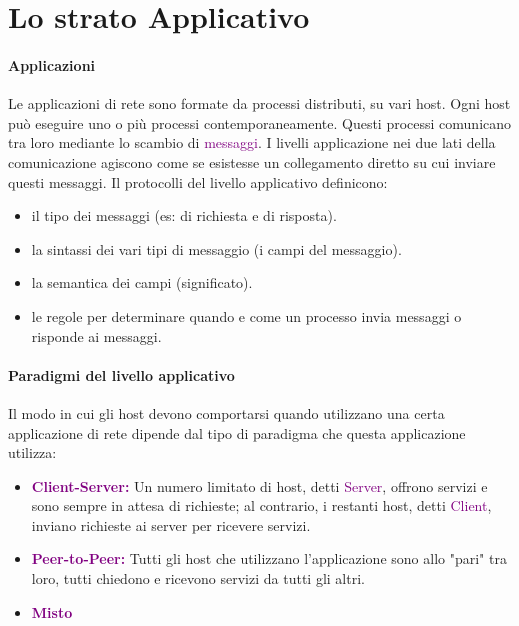\section{Lo strato Applicativo}
\paragraph{Applicazioni} 
Le applicazioni di rete sono formate da processi distributi, su vari host. Ogni host può eseguire uno o più processi contemporaneamente. Questi processi comunicano tra loro mediante lo scambio di \textcolor{purple}{messaggi}.
\newline I livelli applicazione nei due lati della comunicazione agiscono come se esistesse un collegamento diretto su cui inviare questi messaggi.
\newline Il protocolli del livello applicativo definicono:
\begin{itemize}
    \item il tipo dei messaggi (es: di richiesta e di risposta).
    \item la sintassi dei vari tipi di messaggio (i campi del messaggio).
    \item la semantica dei campi (significato).
    \item le regole per determinare quando e come un processo invia messaggi o risponde ai messaggi.
\end{itemize}

\paragraph{Paradigmi del livello applicativo} Il modo in cui gli host devono comportarsi quando utilizzano una certa applicazione di rete dipende dal tipo di paradigma che questa applicazione utilizza:
\begin{itemize}
    \item \textbf{\textcolor{purple}{Client-Server:}} Un numero limitato di host, detti \textcolor{purple}{Server}, offrono servizi e sono sempre in attesa di richieste; al contrario, i restanti host, detti \textcolor{purple}{Client}, inviano richieste ai server per ricevere servizi.
    \item \textbf{\textcolor{purple}{Peer-to-Peer:}} Tutti gli host che utilizzano l'applicazione sono allo "pari" tra loro, tutti chiedono e ricevono servizi da tutti gli altri.
    \item \textbf{\textcolor{purple}{Misto}}
\end{itemize}

